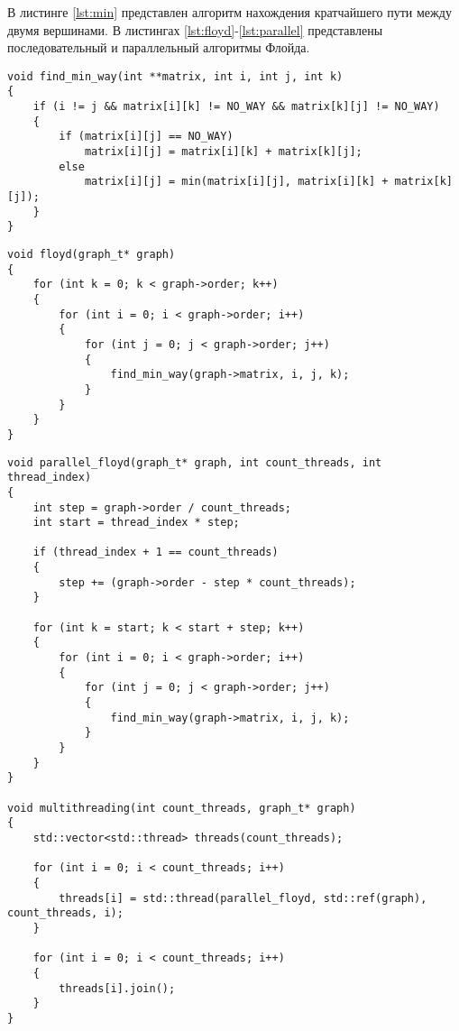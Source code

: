 В листинге \ref{lst:min} представлен алгоритм нахождения кратчайшего пути между двумя вершинами. В листингах \ref{lst:floyd}-\ref{lst:parallel} представлены последовательный и параллельный алгоритмы Флойда.

\begin{center}
    \captionsetup{justification=raggedright,singlelinecheck=off}
    \begin{lstlisting}[label=lst:min,caption=Алгоритм нахождения кратчайшего пути между двумя вершинами]
void find_min_way(int **matrix, int i, int j, int k)
{
    if (i != j && matrix[i][k] != NO_WAY && matrix[k][j] != NO_WAY)
    {
        if (matrix[i][j] == NO_WAY)
            matrix[i][j] = matrix[i][k] + matrix[k][j];
        else
            matrix[i][j] = min(matrix[i][j], matrix[i][k] + matrix[k][j]);
    }
}
\end{lstlisting}
\end{center}

\begin{center}
    \captionsetup{justification=raggedright,singlelinecheck=off}
    \begin{lstlisting}[label=lst:floyd,caption=Последовательный алгоритм Флойда]
void floyd(graph_t* graph)
{
    for (int k = 0; k < graph->order; k++)
    {
        for (int i = 0; i < graph->order; i++)
        {
            for (int j = 0; j < graph->order; j++)
            {
                find_min_way(graph->matrix, i, j, k);
            }
        }
    }
}
\end{lstlisting}
\end{center}

\begin{center}
    \captionsetup{justification=raggedright,singlelinecheck=off}
    \begin{lstlisting}[label=lst:parallel,caption=Параллельный алгоритм Флойда]
void parallel_floyd(graph_t* graph, int count_threads, int thread_index)
{
    int step = graph->order / count_threads;
    int start = thread_index * step;

    if (thread_index + 1 == count_threads)
    {
        step += (graph->order - step * count_threads);
    }

    for (int k = start; k < start + step; k++)
    {
        for (int i = 0; i < graph->order; i++)
        {
            for (int j = 0; j < graph->order; j++)
            {
                find_min_way(graph->matrix, i, j, k);
            }
        }
    }
}

void multithreading(int count_threads, graph_t* graph)
{
    std::vector<std::thread> threads(count_threads);

    for (int i = 0; i < count_threads; i++)
    {
        threads[i] = std::thread(parallel_floyd, std::ref(graph), count_threads, i);
    }

    for (int i = 0; i < count_threads; i++)
    {
        threads[i].join();
    }
}
\end{lstlisting}
\end{center}

